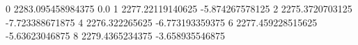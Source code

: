 0 2283.095458984375 0.0
1 2277.22119140625 -5.874267578125
2 2275.3720703125 -7.723388671875
4 2276.322265625 -6.773193359375
6 2277.459228515625 -5.63623046875
8 2279.4365234375 -3.658935546875
